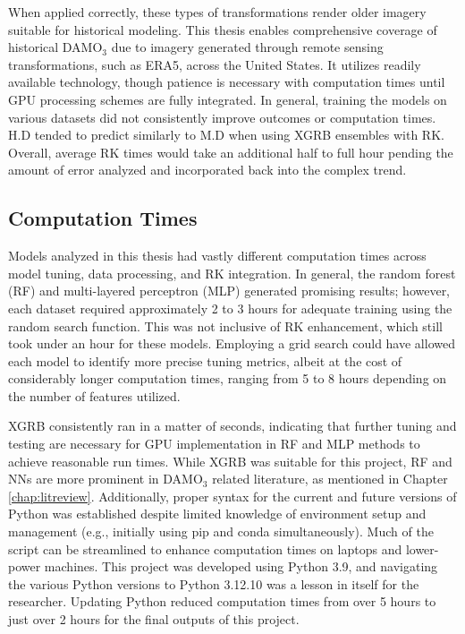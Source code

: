When applied correctly, these types of transformations render older imagery suitable for historical modeling. This thesis enables comprehensive coverage of historical DAMO$_3$ due to imagery generated through remote sensing transformations, such as ERA5, across the United States. It utilizes readily available technology, though patience is necessary with computation times until GPU processing schemes are fully integrated. In general, training the models on various datasets did not consistently improve outcomes or computation times. H.D tended to predict similarly to M.D when using XGRB ensembles with RK. Overall, average RK times would take an additional half to full hour pending the amount of error analyzed and incorporated back into the complex trend.
\subsection{Computation Times} \label{clcsn:comp} Models analyzed in this thesis had vastly different computation times across model tuning, data processing, and RK integration. In general, the random forest (RF) and multi-layered perceptron (MLP) generated promising results; however, each dataset required approximately 2 to 3 hours for adequate training using the random search function. This was not inclusive of RK enhancement, which still took under an hour for these models. Employing a grid search could have allowed each model to identify more precise tuning metrics, albeit at the cost of considerably longer computation times, ranging from 5 to 8 hours depending on the number of features utilized. 

XGRB consistently ran in a matter of seconds, indicating that further tuning and testing are necessary for GPU implementation in RF and MLP methods to achieve reasonable run times. While XGRB was suitable for this project, RF and NNs are more prominent in DAMO$_3$ related literature, as mentioned in Chapter \ref{chap:litreview}. Additionally, proper syntax for the current and future versions of Python was established despite limited knowledge of environment setup and management (e.g., initially using pip and conda simultaneously). Much of the script can be streamlined to enhance computation times on laptops and lower-power machines. This project was developed using Python 3.9, and navigating the various Python versions to Python 3.12.10 was a lesson in itself for the researcher. Updating Python reduced computation times from over 5 hours to just over 2 hours for the final outputs of this project. 

